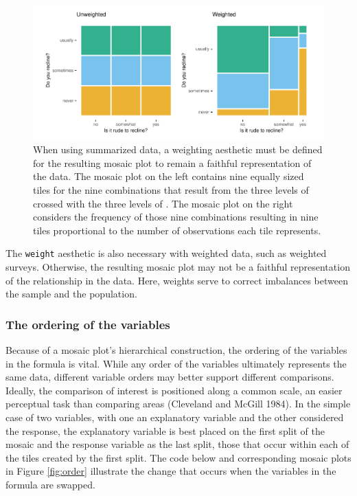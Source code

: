 \begin{figure}

{\centering \includegraphics[width=1\linewidth]{RJ-2023-013_files/figure-latex/weight-1} 

}

\caption{When using summarized data, a weighting aesthetic must be defined for the resulting mosaic plot to remain a faithful representation of the data. The mosaic plot on the left contains nine equally sized tiles for the nine combinations that result from the three levels of  crossed with the three levels of . The mosaic plot on the right considers the frequency of those nine combinations resulting in nine tiles proportional to the number of observations each tile represents.}\label{fig:weight}
\end{figure}

The \texttt{weight} aesthetic is also necessary with weighted data, such as weighted surveys. Otherwise, the resulting mosaic plot may not be a faithful representation of the relationship in the data. Here, weights serve to correct imbalances between the sample and the population.

\hypertarget{the-ordering-of-the-variables}{%
\subsubsection{The ordering of the variables}\label{the-ordering-of-the-variables}}

Because of a mosaic plot's hierarchical construction, the ordering of the variables in the formula is vital. While any order of the variables ultimately represents the same data, different variable orders may better support different comparisons. Ideally, the comparison of interest is positioned along a common scale, an easier perceptual task than comparing areas (Cleveland and McGill 1984). In the simple case of two variables, with one an explanatory variable and the other considered the response, the explanatory variable is best placed on the first split of the mosaic and the response variable as the last split, those that occur within each of the tiles created by the first split. The code below and corresponding mosaic plots in Figure \ref{fig:order} illustrate the change that occurs when the variables in the formula are swapped.

